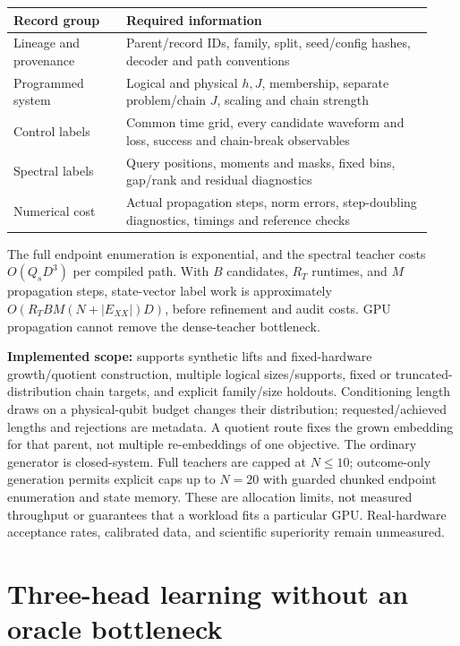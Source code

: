 \documentclass[10pt]{article}
\newcommand{\code}[1]{\texttt{\detokenize{#1}}}
\begin{document}
\begin{center}
\small
\begin{tabular}{p{0.25\linewidth}p{0.68\linewidth}}
\toprule
Record group & Required information \\
\midrule
Lineage and provenance & Parent/record IDs, family, split, seed/config hashes, decoder and path conventions \\
Programmed system & Logical and physical $h,J$, membership, separate problem/chain $J$, scaling and chain strength \\
Control labels & Common time grid, every candidate waveform and loss, success and chain-break observables \\
Spectral labels & Query positions, moments and masks, fixed bins, gap/rank and residual diagnostics \\
Numerical cost & Actual propagation steps, norm errors, step-doubling diagnostics, timings and reference checks \\
\bottomrule
\end{tabular}
\end{center}

The full endpoint enumeration is exponential, and the spectral teacher costs
$O(Q_sD^3)$ per compiled path. With $B$ candidates, $R_T$ runtimes, and $M$
propagation steps, state-vector label work is approximately
$O(R_TBM(N+|E_{XX}|)D)$, before refinement and audit costs.
GPU propagation cannot remove the dense-teacher bottleneck.

\textbf{Implemented scope:} \code{pipeline.py} supports synthetic lifts and
fixed-hardware growth/quotient construction, multiple logical sizes/supports,
fixed or truncated-distribution chain targets, and explicit family/size holdouts.
Conditioning length draws on a physical-qubit budget changes their distribution;
requested/achieved lengths and rejections are metadata. A quotient route fixes
the grown embedding for that parent, not multiple re-embeddings of one objective.
The ordinary generator is closed-system. Full teachers are capped at $N\le10$;
outcome-only generation permits explicit caps up to $N=20$ with guarded chunked
endpoint enumeration and state memory. These are allocation limits, not measured
throughput or guarantees that a workload fits a particular GPU. Real-hardware
acceptance rates, calibrated data, and scientific superiority remain unmeasured.

\newpage
\section{Three-head learning without an oracle bottleneck}
\end{document}
